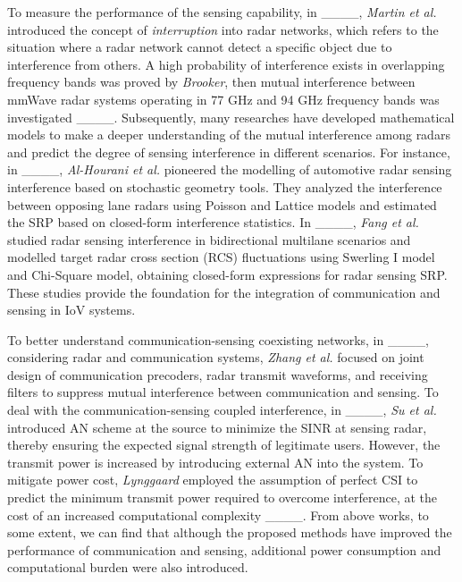 To measure the performance of the sensing capability, in ____, \emph{Martin et al.} introduced the concept of \emph{interruption} into radar networks, which refers to the situation where a radar network cannot detect a specific object due to interference from others. A high probability of interference exists in overlapping frequency bands was proved by \emph{Brooker}, then mutual interference between mmWave radar systems operating in 77 GHz and 94 GHz frequency bands was investigated ____. Subsequently, many researches have developed mathematical models to make a deeper understanding of the mutual interference among radars and predict the degree of sensing interference in different scenarios. 
For instance, 
in ____, \emph{Al-Hourani et al.} pioneered the modelling of automotive radar sensing interference based on stochastic geometry tools. They analyzed the interference between opposing lane radars using Poisson and Lattice models and estimated the SRP based on closed-form interference statistics. 
In ____, \emph{Fang et al.} studied radar sensing interference in bidirectional multilane scenarios and modelled target radar cross section (RCS) fluctuations using Swerling I model and Chi-Square model, obtaining closed-form expressions for radar sensing SRP. These studies provide the foundation for the integration of communication and sensing in IoV systems.

To better understand communication-sensing coexisting networks, in ____, considering radar and communication systems, \emph{Zhang et al.} focused on joint design of communication precoders, radar transmit waveforms, and receiving filters to suppress mutual interference between communication and sensing. 
To deal with the communication-sensing coupled interference, in ____, \emph{Su et al.} introduced AN scheme at the source to minimize the SINR at sensing radar, thereby ensuring the expected signal strength of legitimate users. However, the transmit power is increased by introducing external AN into the system. To mitigate power cost, \emph{Lynggaard} employed the assumption of perfect CSI to predict the minimum transmit power required to overcome interference, at the cost of an increased computational complexity ____. From above works, to some extent, we can find that although the proposed methods have improved the performance of communication and sensing, additional power consumption and computational burden were also introduced.

